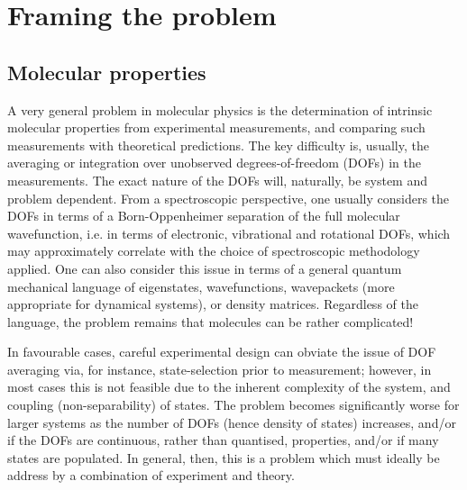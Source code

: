 \section{Framing the problem}

\subsection{Molecular properties}
A very general problem in molecular physics is the determination of intrinsic molecular properties from experimental measurements, and comparing such measurements with theoretical predictions. The key difficulty is, usually, the averaging or integration over unobserved degrees-of-freedom (DOFs) in the measurements. The exact nature of the DOFs will, naturally, be system and problem dependent. From a spectroscopic perspective, one usually considers the DOFs in terms of a Born-Oppenheimer separation of the full molecular wavefunction, i.e. in terms of electronic, vibrational and rotational DOFs, which may approximately correlate with the choice of spectroscopic methodology applied. One can also consider this issue in terms of a general quantum mechanical language of eigenstates, wavefunctions, wavepackets (more appropriate for dynamical systems), or density matrices.  Regardless of the language, the problem remains that molecules can be rather complicated!

In favourable cases, careful experimental design can obviate the issue of DOF averaging via, for instance, state-selection prior to measurement; however, in most cases this is not feasible due to the inherent complexity of the system, and coupling (non-separability) of states. The problem becomes significantly worse for larger systems as the number of DOFs (hence density of states) increases, and/or if the DOFs are continuous, rather than quantised, properties, and/or if many states are populated. In general, then, this is a problem which must ideally be address by a combination of experiment and theory.
